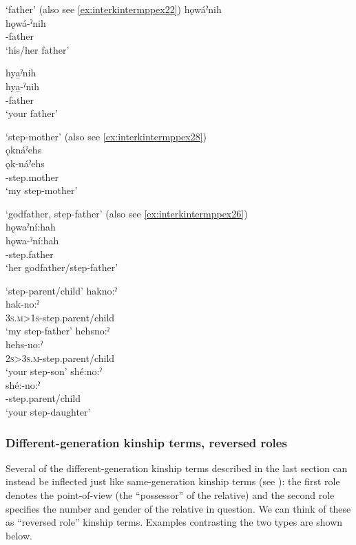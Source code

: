 \ea\label{ex:interkintermppex21}  ‘father’ (also see \ref{ex:interkintermppex22})
\ea hǫwáˀnih\\
\gll hǫwá-ˀnih\\
 -father\\
\glt `his/her father'

\ex hya̱ˀnih\\
\gll hya̱-ˀnih\\
 -father\\
\glt `your father'
\z
\z

\ea\label{ex:interkintermppex23}
 ‘step-mother’ (also see \ref{ex:interkintermppex28})\\
ǫknáˀehs\\
\gll ǫk-náˀehs\\
-step.mother\\
\glt ‘my step-mother’
\z


\ea\label{ex:interkintermppex25}
 ‘godfather, step-father’ (also see \ref{ex:interkintermppex26})\\
hǫwaˀní:hah\\
\gll hǫwa-ˀní:hah\\
 -step.father\\
\glt `her godfather/step-father'
\z


\ea\label{ex:interkintermppex5}  ‘step-parent/child’
\ea hakno:ˀ\\
\gll hak-no:ˀ\\
 \textsc{3s.m>1s}-step.parent/child\\
\glt `my step-father'
\ex hehsno:ˀ\\
\gll hehs-no:ˀ\\
 \textsc{2s>3s.m}-step.parent/child\\
\glt `your step-son'
\ex shé:no:ˀ\\
\gll shé:-no:ˀ\\
 -step.parent/child\\
\glt `your step-daughter'
\z
\z

\subsubsection*{Different-generation kinship terms, reversed roles} \label{ch:Different-generation kinship terms, reversed roles}
Several of the different-generation kinship terms described in the last section can instead be inflected just like same-generation kinship terms (see ): the first role denotes the point-of-view (the “possessor” of the relative) and the second role specifies the number and gender of the relative in question. We can think of these as “reversed role” kinship terms. Examples contrasting the two types are shown below.

